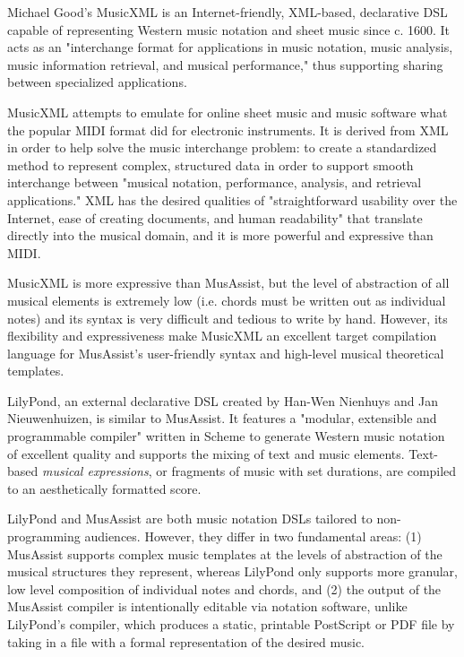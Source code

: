 \documentclass{article}
\begin{document}
Michael Good's MusicXML is an Internet-friendly, XML-based, declarative DSL capable of representing Western music 
notation and sheet music since c. 1600. 
It acts as an "interchange format for applications in music notation, music analysis, music information retrieval, 
and musical performance," thus supporting sharing between specialized applications. %

MusicXML attempts to emulate for online sheet music and music software what the popular MIDI format 
did for electronic instruments. It is derived from XML in order to help solve the music 
interchange problem: to create a standardized method to represent complex, structured data in order to support 
smooth interchange between "musical notation, performance, analysis, and retrieval applications." XML has the 
desired qualities of "straightforward usability over the Internet, ease of creating documents, and human readability" 
that translate directly into the musical domain, and it is more powerful and expressive 
than MIDI. %

MusicXML is more expressive than MusAssist, but the
level of abstraction of all musical elements is extremely low (i.e. chords must be written out 
as individual notes) and its syntax is very difficult and tedious to write by hand. However,
its flexibility and expressiveness make MusicXML an excellent target 
compilation language for MusAssist's user-friendly syntax and high-level musical theoretical templates.

LilyPond, an external declarative DSL created by Han-Wen Nienhuys and 
Jan Nieuwenhuizen, is similar to MusAssist. It features a "modular, extensible and programmable 
compiler" written in Scheme to generate Western music notation of excellent quality and supports the mixing of text and music elements. 
Text-based \textit{musical expressions}, or fragments of music with 
set durations, are compiled to an aesthetically formatted score.

LilyPond and MusAssist are both music notation DSLs tailored to non-programming audiences. However, 
they differ in two fundamental areas: 
(1) MusAssist supports complex music templates at the levels of abstraction of the 
musical structures they represent, whereas LilyPond only supports 
more granular, low level composition of individual notes and chords, and (2) the output of the MusAssist compiler is intentionally editable via
notation software, unlike LilyPond's compiler, which produces a static, printable PostScript or PDF file by 
taking in a file with a formal representation of the desired music.
\end{document}
